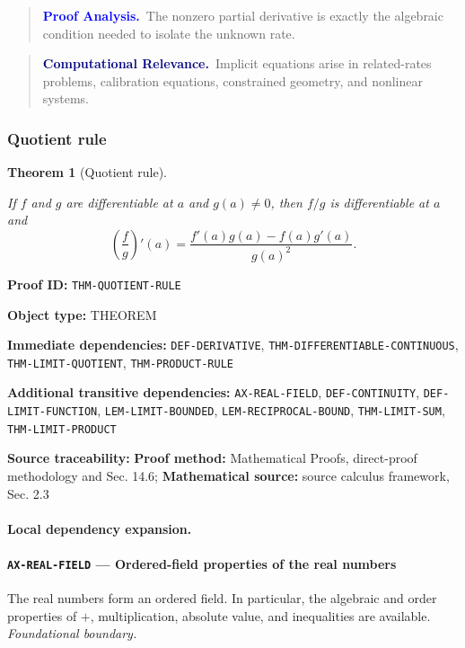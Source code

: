 \documentclass[10pt]{article}
\newcommand{\pidraw}[1]{\begingroup\urlstyle{tt}\nolinkurl{#1}\endgroup}
\newtheorem{theorem}{Theorem}[section]
\theoremstyle{definition}
\theoremstyle{remark}
\newenvironment{proofanalysis}
{\begin{quote}\small\noindent\textbf{\textcolor{blue}{Proof Analysis.}}\ }
{\end{quote}}
\newenvironment{computationalrelevance}
{\begin{quote}\small\noindent\textbf{\textcolor{navy}{Computational Relevance.}}\ }
{\end{quote}}
\newcommand{\meta}[2]{\noindent\textbf{#1:} #2\par}
\begin{document}
\begin{proofanalysis}The nonzero partial derivative is exactly the algebraic condition needed to isolate the unknown rate.\end{proofanalysis}

\begin{computationalrelevance}Implicit equations arise in related-rates problems, calibration equations, constrained geometry, and nonlinear systems.\end{computationalrelevance}

\subsubsection{Quotient rule}

\begin{theorem}[Quotient rule]\label{prf:THM-QUOTIENT-RULE}

If $f$ and $g$ are differentiable at $a$ and $g(a)\ne0$, then $f/g$ is differentiable at $a$ and
\[
\left(\frac{f}{g}\right)'(a)=
\frac{f'(a)g(a)-f(a)g'(a)}{g(a)^2}.
\]

\end{theorem}

\meta{Proof ID}{\pidraw{THM-QUOTIENT-RULE}}
\meta{Object type}{THEOREM}
\meta{Immediate dependencies}{\pidraw{DEF-DERIVATIVE}, \pidraw{THM-DIFFERENTIABLE-CONTINUOUS}, \pidraw{THM-LIMIT-QUOTIENT}, \pidraw{THM-PRODUCT-RULE}}
\meta{Additional transitive dependencies}{\pidraw{AX-REAL-FIELD}, \pidraw{DEF-CONTINUITY}, \pidraw{DEF-LIMIT-FUNCTION}, \pidraw{LEM-LIMIT-BOUNDED}, \pidraw{LEM-RECIPROCAL-BOUND}, \pidraw{THM-LIMIT-SUM}, \pidraw{THM-LIMIT-PRODUCT}}
\meta{Source traceability}{\textbf{Proof method:} Mathematical Proofs, direct-proof methodology and Sec. 14.6; \textbf{Mathematical source:} source calculus framework, Sec. 2.3}

\paragraph{Local dependency expansion.}

\paragraph{\pidraw{AX-REAL-FIELD} --- Ordered-field properties of the real numbers}
The real numbers form an ordered field. In particular, the algebraic and order properties of $+$, multiplication, absolute value, and inequalities are available.
\textit{Foundational boundary.}
\end{document}
